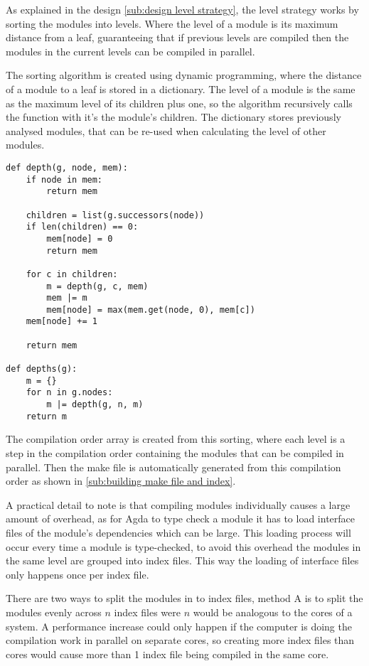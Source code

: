 As explained in the design \cref{sub:design level strategy}, the level
strategy works by sorting the modules into levels. Where the level of a module
is its maximum distance from a leaf, guaranteeing that if previous levels are
compiled then the modules in the current levels can be compiled in parallel.

The sorting algorithm is created using dynamic programming, where the distance
of a module to a leaf is stored in a dictionary. The level of a module is the
same as the maximum level of its children plus one, so the algorithm
recursively calls the function with it's the module's children. The dictionary
stores previously analysed modules, that can be re-used when calculating the
level of other modules.

\begin{lstlisting}
def depth(g, node, mem):
    if node in mem:
        return mem

    children = list(g.successors(node))
    if len(children) == 0:
        mem[node] = 0
        return mem

    for c in children:
        m = depth(g, c, mem)
        mem |= m
        mem[node] = max(mem.get(node, 0), mem[c])
    mem[node] += 1

    return mem

def depths(g):
    m = {}
    for n in g.nodes:
        m |= depth(g, n, m)
    return m
\end{lstlisting}

The compilation order array is created from this sorting, where each level is a
step in the compilation order containing the modules that can be compiled in
parallel. Then the make file is automatically generated from this compilation
order as shown in \cref{sub:building make file and index}.

A practical detail to note is that compiling modules individually causes a
large amount of overhead, as for Agda to type check a module it has to load
interface files of the module's dependencies which can be large. This loading
process will occur every time a module is type-checked, to avoid this overhead
the modules in the same level are grouped into index files. This way the
loading of interface files only happens once per index file.

There are two ways to split the modules in to index files, method A is to split
the modules evenly across \(n\) index files were \(n\) would be analogous to
the cores of a system. A performance increase could only happen if the computer
is doing the compilation work in parallel on separate cores, so creating more
index files than cores would cause more than 1 index file being compiled in the
same core.

